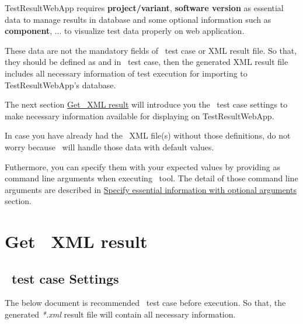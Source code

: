 



TestResultWebApp requires \textbf{project/variant}, \textbf{software version}
as essential data to manage results in database and some optional information
such as \textbf{component}, ... to visualize test data properly on web application.

These data are not the mandatory fields of \rfwcore\ test case or XML result file.
So that, they should be defined as  and \rcode{[Tags]} in
\rfwcore\ test case, then the generated XML result file includes all necessary
information of test execution for importing to TestResultWebApp's database.

The next section \hyperref[description-get-robotframework-xml-result]
{Get \rfwcore\ XML result} will introduce you the \rfwcore\ test case settings
to make necessary information available for displaying on TestResultWebApp.

In case you have already had the \rfwcore\ XML file(s) without those
definitions, do not worry because \pkg\ will handle those data with default values.

Futhermore, you can specify them with your expected values by providing as
command line arguments when executing \pkg\ tool. The detail of those command
line arguments are described in \hyperref[optional-arguments]
{Specify essential information with optional arguments} section.

\hypertarget{description-get-robotframework-xml-result}{%
\section{Get \rfwcore\ XML result}
\label{description-get-robotframework-xml-result}}

  \hypertarget{description-robotframework-testcase-settings}{%
  \subsection{\rfwcore\ test case Settings}
  \label{description-robotframework-testcase-settings}}
    The below document is recommended \rfwcore\ test case 
    before execution.
    So that, the generated \emph{*.xml} result file will contain all necessary
    information.

